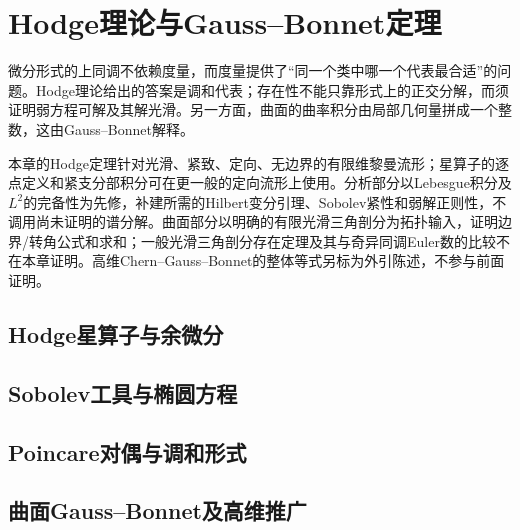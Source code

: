 \chapter{Hodge理论与Gauss--Bonnet定理}
\label{ch:14-hodge-gauss-bonnet}

微分形式的上同调不依赖度量，而度量提供了“同一个类中哪一个代表最合适”的问题。Hodge理论给出的答案是调和代表；存在性不能只靠形式上的正交分解，而须证明弱方程可解及其解光滑。另一方面，曲面的曲率积分由局部几何量拼成一个整数，这由Gauss--Bonnet解释。

本章的Hodge定理针对光滑、紧致、定向、无边界的有限维黎曼流形；星算子的逐点定义和紧支分部积分可在更一般的定向流形上使用。分析部分以Lebesgue积分及$L^2$的完备性为先修，补建所需的Hilbert变分引理、Sobolev紧性和弱解正则性，不调用尚未证明的谱分解。曲面部分以明确的有限光滑三角剖分为拓扑输入，证明边界/转角公式和求和；一般光滑三角剖分存在定理及其与奇异同调Euler数的比较不在本章证明。高维Chern--Gauss--Bonnet的整体等式另标为外引陈述，不参与前面证明。

\section{Hodge星算子与余微分}


\section{Sobolev工具与椭圆方程}



\section{Poincare对偶与调和形式}


\section{曲面Gauss--Bonnet及高维推广}



